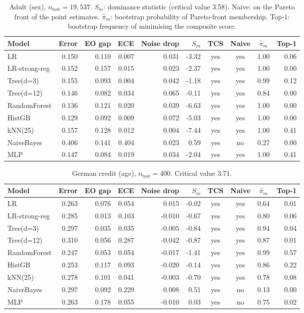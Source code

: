 \documentclass[pdflatex,sn-mathphys-num,iicol]{sn-jnl}
\theoremstyle{thmstyleone}
\theoremstyle{thmstyletwo}
\begin{document}
\begin{table}[t]\centering\small
\caption{Adult (sex), $n_{\text{test}}=19{,}537$. $S_m$: dominance statistic (critical value 3.58). Naive: on the Pareto front of the point estimates. $\hat\pi_m$: bootstrap probability of Pareto-front membership. Top-1: bootstrap frequency of minimising the composite score.}\label{tab:adult}
\begin{tabular}{lrrrrrcccr}\toprule
Model & Error & EO gap & ECE & Noise drop & $S_m$ & TCS & Naive & $\hat\pi_m$ & Top-1 \\\midrule
LR & 0.150 & 0.110 & 0.007 & 0.031 & -3.32 & yes & yes & 1.00 & 0.06 \\
LR-strong-reg & 0.152 & 0.157 & 0.015 & 0.023 & -2.37 & yes & yes & 1.00 & 0.00 \\
Tree(d=3) & 0.155 & 0.093 & 0.004 & 0.042 & -1.18 & yes & yes & 0.99 & 0.12 \\
Tree(d=12) & 0.146 & 0.082 & 0.034 & 0.065 & -0.11 & yes & yes & 0.84 & 0.00 \\
RandomForest & 0.136 & 0.121 & 0.020 & 0.039 & -6.63 & yes & yes & 1.00 & 0.00 \\
HistGB & 0.129 & 0.092 & 0.009 & 0.072 & -5.03 & yes & yes & 1.00 & 0.00 \\
kNN(25) & 0.157 & 0.128 & 0.012 & 0.004 & -7.44 & yes & yes & 1.00 & 0.41 \\
NaiveBayes & 0.406 & 0.141 & 0.404 & 0.023 & 0.59 & yes & no & 0.27 & 0.00 \\
MLP & 0.147 & 0.084 & 0.019 & 0.034 & -2.04 & yes & yes & 1.00 & 0.41 \\
\bottomrule\end{tabular}
\end{table}
\begin{table}[t]\centering\small
\caption{German credit (age), $n_{\text{test}}=400$. Critical value 3.71.}\label{tab:german}
\begin{tabular}{lrrrrrcccr}\toprule
Model & Error & EO gap & ECE & Noise drop & $S_m$ & TCS & Naive & $\hat\pi_m$ & Top-1 \\\midrule
LR & 0.263 & 0.076 & 0.054 & 0.015 & -0.02 & yes & yes & 0.64 & 0.01 \\
LR-strong-reg & 0.285 & 0.013 & 0.103 & -0.010 & -0.67 & yes & yes & 0.80 & 0.06 \\
Tree(d=3) & 0.297 & 0.035 & 0.035 & -0.005 & -0.84 & yes & yes & 0.94 & 0.04 \\
Tree(d=12) & 0.310 & 0.056 & 0.287 & -0.042 & -0.87 & yes & yes & 0.87 & 0.01 \\
RandomForest & 0.247 & 0.053 & 0.054 & -0.017 & -1.41 & yes & yes & 0.99 & 0.57 \\
HistGB & 0.253 & 0.117 & 0.093 & -0.020 & -0.14 & yes & yes & 0.86 & 0.22 \\
kNN(25) & 0.278 & 0.101 & 0.041 & -0.003 & -0.70 & yes & yes & 0.78 & 0.08 \\
NaiveBayes & 0.297 & 0.092 & 0.229 & 0.008 & 0.51 & yes & no & 0.13 & 0.00 \\
MLP & 0.263 & 0.178 & 0.055 & -0.010 & 0.03 & yes & no & 0.75 & 0.02 \\
\bottomrule\end{tabular}
\end{table}
\end{document}
